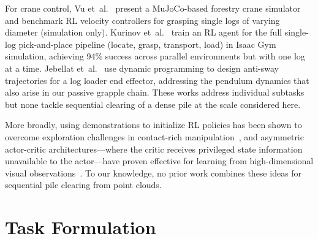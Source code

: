 \documentclass[conference]{IEEEtran}
\begin{document}
For crane control, Vu et~al.~\cite{vu2025autonomous} present a MuJoCo-based forestry crane simulator and benchmark RL velocity controllers for grasping single logs of varying diameter (simulation only).
Kurinov et~al.~\cite{kurinov2025reinforcement} train an RL agent for the full single-log pick-and-place pipeline (locate, grasp, transport, load) in Isaac Gym simulation, achieving 94\% success across parallel environments but with one log at a time.
Jebellat et~al.~\cite{jebellat2025designing} use dynamic programming to design anti-sway trajectories for a log loader end effector, addressing the pendulum dynamics that also arise in our passive grapple chain.
These works address individual subtasks but none tackle sequential clearing of a dense pile at the scale considered here.

More broadly, using demonstrations to initialize RL policies has been shown to overcome exploration challenges in contact-rich manipulation~\cite{rajeswaran2018learning, nair2018overcoming}, and asymmetric actor-critic architectures---where the critic receives privileged state information unavailable to the actor---have proven effective for learning from high-dimensional visual observations~\cite{pinto2018asymmetric}.
To our knowledge, no prior work combines these ideas for sequential pile clearing from point clouds.

\section{Task Formulation}
\end{document}
